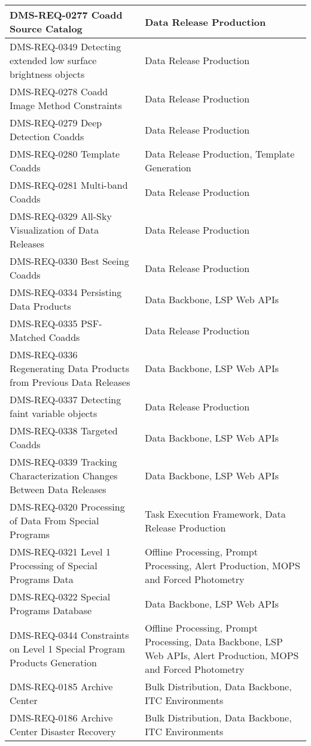 \begin{xtabular}{p{0.4\textwidth}p{0.55\textwidth}}
DMS-REQ-0277 Coadd Source Catalog & Data Release
Production\\ \hline
DMS-REQ-0349 Detecting extended low surface brightness objects & Data
Release Production\\ \hline
DMS-REQ-0278 Coadd Image Method Constraints & Data Release
Production\\ \hline
DMS-REQ-0279 Deep Detection Coadds & Data Release
Production\\ \hline
DMS-REQ-0280 Template Coadds & Data Release Production, Template
Generation\\ \hline
DMS-REQ-0281 Multi-band Coadds & Data Release Production\\ \hline
DMS-REQ-0329 All-Sky Visualization of Data Releases & Data Release
Production\\ \hline
DMS-REQ-0330 Best Seeing Coadds & Data Release Production\\ \hline
DMS-REQ-0334 Persisting Data Products & Data Backbone, LSP Web APIs\\ \hline
DMS-REQ-0335 PSF-Matched Coadds & Data Release Production\\ \hline
DMS-REQ-0336 Regenerating Data Products from Previous Data Releases &
Data Backbone, LSP Web APIs\\ \hline
DMS-REQ-0337 Detecting faint variable objects & Data Release
Production\\ \hline
DMS-REQ-0338 Targeted Coadds & Data Backbone, LSP Web APIs\\ \hline
DMS-REQ-0339 Tracking Characterization Changes Between Data Releases &
Data Backbone, LSP Web APIs\\ \hline
DMS-REQ-0320 Processing of Data From Special Programs & Task Execution
Framework, Data Release Production\\ \hline
DMS-REQ-0321 Level 1 Processing of Special Programs Data & Offline
Processing, Prompt Processing, Alert Production, MOPS and Forced
Photometry\\ \hline
DMS-REQ-0322 Special Programs Database & Data Backbone, LSP Web APIs\\ \hline
DMS-REQ-0344 Constraints on Level 1 Special Program Products Generation
& Offline Processing, Prompt Processing, Data Backbone, LSP Web APIs,
Alert Production, MOPS and Forced Photometry\\ \hline
DMS-REQ-0185 Archive Center & Bulk Distribution, Data Backbone, ITC
Environments\\ \hline
DMS-REQ-0186 Archive Center Disaster Recovery & Bulk Distribution, Data
Backbone, ITC Environments\\ \hline

\end{xtabular}
